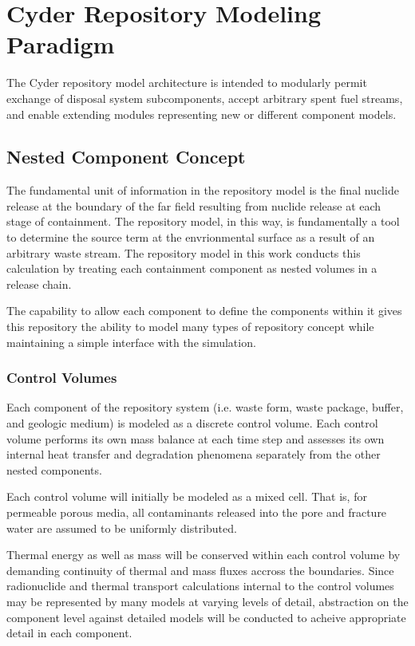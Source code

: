 \section{Cyder Repository Modeling Paradigm}

The Cyder repository model architecture is intended to modularly permit 
exchange of disposal system subcomponents, accept arbitrary spent fuel 
streams, and enable extending modules representing new or different 
component models.

\subsection{Nested Component Concept}

The fundamental unit of information in the repository model is the final nuclide  
release at the boundary of the far field resulting from nuclide release at 
each stage of containment.  The repository model, in this way, is fundamentally 
a tool to determine the source term at the envrionmental surface as a result 
of an arbitrary waste stream. The repository model in this work conducts this 
calculation by  treating each containment component as nested volumes in a 
release chain. 

The capability to allow each component to define the components within it 
gives this repository the ability to model many types of repository concept 
while maintaining a simple interface with the simulation. 

\subsubsection{Control Volumes}

Each component of the repository system (i.e. waste form, waste package, buffer, 
and geologic medium) is modeled as a discrete control volume. Each control 
volume performs its own mass balance at each time step and assesses its own 
internal  heat transfer and degradation phenomena separately from the other 
nested components.

Each control volume will initially be modeled as a mixed cell. That is, for 
permeable porous media, all contaminants released into the pore and fracture 
water are assumed to be uniformly distributed.

Thermal energy as well as mass will be conserved within each control volume by 
demanding continuity of thermal and mass fluxes accross the boundaries. Since 
radionuclide and thermal transport calculations internal to the control volumes  
may be represented by many models at varying levels of detail, abstraction on 
the component level against detailed models will be conducted to acheive 
appropriate detail in each component. 

